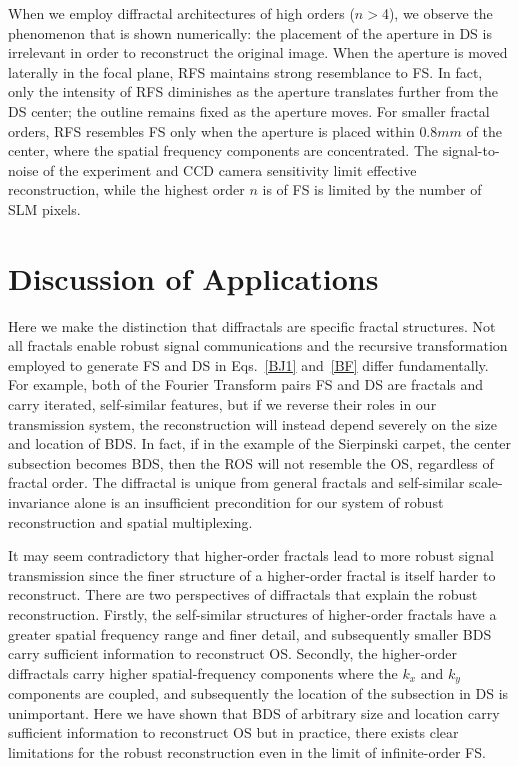 When we employ diffractal architectures of high orders ($n>$4), we observe the phenomenon that is shown numerically: the placement of the aperture in DS is irrelevant in order to reconstruct the original image. When the aperture is moved laterally in the focal plane, RFS maintains strong resemblance to FS. In fact, only the intensity of RFS diminishes as the aperture translates further from the DS center; the outline remains fixed as the aperture moves.  For smaller fractal orders, RFS resembles FS only when the aperture is placed within $0.8mm$ of the center, where the spatial frequency components are concentrated. The signal-to-noise of the experiment and CCD camera sensitivity limit effective reconstruction, while the highest order $n$ is of FS is limited by the number of SLM pixels.  

\section{Discussion of Applications}\label{disc}
Here we make the distinction that diffractals are specific fractal structures. Not all fractals enable robust signal communications and the recursive transformation employed to generate FS and DS in Eqs.~\ref{BJ1} and~\ref{BF} differ fundamentally. For example, both of the Fourier Transform pairs FS and DS are fractals and carry iterated, self-similar features, but if we reverse their roles in our transmission system, the reconstruction will instead depend severely on the size and location of BDS. In fact, if in the example of the Sierpinski carpet, the center subsection becomes BDS, then the ROS will not resemble the OS, regardless of fractal order.  The diffractal is unique from general fractals and self-similar scale-invariance alone is an insufficient precondition for our system of robust reconstruction and spatial multiplexing. 

It may seem contradictory that higher-order fractals lead to more robust signal transmission since the finer structure of a higher-order fractal is itself harder to reconstruct. There are two perspectives of diffractals that explain the robust reconstruction. Firstly, the self-similar structures of higher-order fractals have a greater spatial frequency range and finer detail, and subsequently smaller BDS carry sufficient information to reconstruct OS. Secondly, the higher-order diffractals carry higher spatial-frequency components where the $k_x$ and $k_y$ components are coupled, and subsequently the location of the subsection in DS is unimportant. Here we have shown that BDS of arbitrary size and location carry sufficient information to reconstruct OS but in practice, there exists clear limitations for the robust reconstruction even in the limit of infinite-order FS.  


